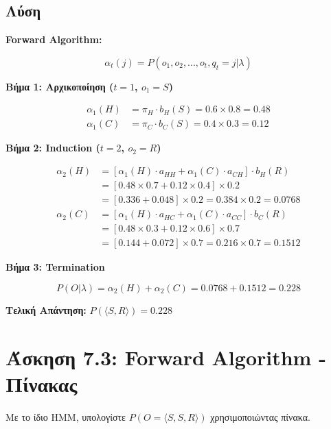 \subsection*{Λύση}

\textbf{Forward Algorithm:}

$$\alpha_t(j) = P(o_1, o_2, ..., o_t, q_t = j | \lambda)$$

\textbf{Βήμα 1: Αρχικοποίηση ($t=1$, $o_1 = S$)}

\begin{align*}
\alpha_1(H) &= \pi_H \cdot b_H(S) = 0.6 \times 0.8 = 0.48 \\
\alpha_1(C) &= \pi_C \cdot b_C(S) = 0.4 \times 0.3 = 0.12
\end{align*}

\textbf{Βήμα 2: Induction ($t=2$, $o_2 = R$)}

\begin{align*}
\alpha_2(H) &= \left[\alpha_1(H) \cdot a_{HH} + \alpha_1(C) \cdot a_{CH}\right] \cdot b_H(R) \\
&= [0.48 \times 0.7 + 0.12 \times 0.4] \times 0.2 \\
&= [0.336 + 0.048] \times 0.2 = 0.384 \times 0.2 = 0.0768 \\[5pt]
\alpha_2(C) &= \left[\alpha_1(H) \cdot a_{HC} + \alpha_1(C) \cdot a_{CC}\right] \cdot b_C(R) \\
&= [0.48 \times 0.3 + 0.12 \times 0.6] \times 0.7 \\
&= [0.144 + 0.072] \times 0.7 = 0.216 \times 0.7 = 0.1512
\end{align*}

\textbf{Βήμα 3: Termination}

$$P(O | \lambda) = \alpha_2(H) + \alpha_2(C) = 0.0768 + 0.1512 = 0.228$$

\textbf{Τελική Απάντηση:} $P(\langle S, R \rangle) = 0.228$

\section{Άσκηση 7.3: Forward Algorithm - Πίνακας}

\begin{formulabox}[Εκφώνηση]
Με το ίδιο HMM, υπολογίστε $P(O = \langle S, S, R \rangle)$ χρησιμοποιώντας πίνακα.
\end{formulabox}

